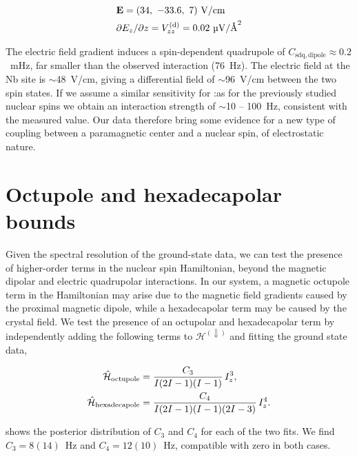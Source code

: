 \begin{align}
\begin{split}
    &\mathbf{E} = (34,~-33.6,~7) \text{~V/cm}\\
    &\partial E_z / \partial z = V^{\text{(d)}}_{zz} = 0.02~\text{\textmu V/\r{A}}^2
\end{split}
\end{align}

The electric field gradient induces a spin-dependent quadrupole of $C_\mathrm{sdq, dipole} \approx 0.2$~mHz, far smaller than the observed interaction (76~Hz). The electric field at the Nb site is $\sim$48~V/cm, giving a differential field of $\sim$96~V/cm between the two spin states. If we assume a similar sensitivity for \Nb:\Ca as for the previously studied nuclear spins  we obtain an interaction strength of $\sim$10 -- 100~Hz, consistent with the measured value. Our data therefore bring some evidence for a new type of coupling between a paramagnetic center and a nuclear spin, of electrostatic nature. 

\section{Octupole and hexadecapolar bounds}

Given the spectral resolution of the ground-state data, we can test the presence of higher-order terms in the nuclear spin Hamiltonian, beyond the magnetic dipolar and electric quadrupolar interactions. In our system, a magnetic octupole term in the \Nb Hamiltonian may arise due to the magnetic field gradients caused by the proximal \Er magnetic dipole, while a hexadecapolar term may be caused by the crystal field. We test the presence of an octupolar and hexadecapolar term by independently adding the following terms to $\mathcal{H^{(\Downarrow)}}$ and fitting the ground state data,

\begin{align}
\begin{split}
    \hat{\mathcal{H}}_{\text{octupole}} &= \frac{C_3}{I(2I-1)(I-1)}\,I_z^3 , \\
    \hat{\mathcal{H}}_{\text{hexadecapole}} &= \frac{C_4}{I(2I-1)(I-1)(2 I -3)}\,  I_z^4.
\end{split}
\end{align}

 shows the posterior distribution of $C_3$ and $C_4$ for each of the two fits. We find $C_3 = 8(14)$~Hz and $C_4 = 12(10)$~Hz, compatible with zero in both cases. 

